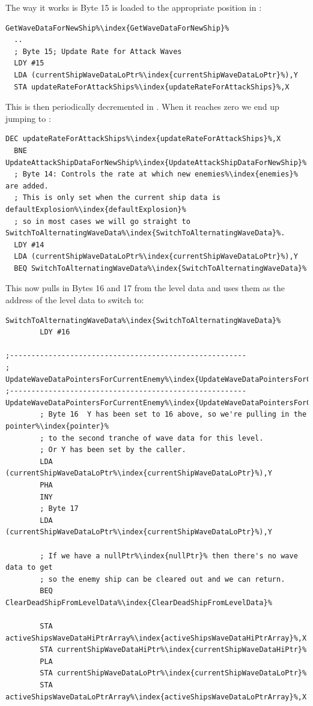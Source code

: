 The way it works is Byte 15 is loaded to the appropriate position in :

\begin{lstlisting}[escapechar=\%]
GetWaveDataForNewShip%\index{GetWaveDataForNewShip}%
  ..
  ; Byte 15; Update Rate for Attack Waves
  LDY #15
  LDA (currentShipWaveDataLoPtr%\index{currentShipWaveDataLoPtr}%),Y
  STA updateRateForAttackShips%\index{updateRateForAttackShips}%,X
\end{lstlisting}

This is then periodically decremented in . When it reaches zero we 
end up jumping to :
\begin{lstlisting}[escapechar=\%]
  DEC updateRateForAttackShips%\index{updateRateForAttackShips}%,X
  BNE UpdateAttackShipDataForNewShip%\index{UpdateAttackShipDataForNewShip}%
  ; Byte 14: Controls the rate at which new enemies%\index{enemies}% are added.
  ; This is only set when the current ship data is defaultExplosion%\index{defaultExplosion}%
  ; so in most cases we will go straight to SwitchToAlternatingWaveData%\index{SwitchToAlternatingWaveData}%.
  LDY #14
  LDA (currentShipWaveDataLoPtr%\index{currentShipWaveDataLoPtr}%),Y
  BEQ SwitchToAlternatingWaveData%\index{SwitchToAlternatingWaveData}%
\end{lstlisting}

This now pulls in Bytes 16 and 17 from the level data and uses them as the address of the level data to 
switch to:
\begin{lstlisting}[escapechar=\%]
SwitchToAlternatingWaveData%\index{SwitchToAlternatingWaveData}%   
        LDY #16

;-------------------------------------------------------
; UpdateWaveDataPointersForCurrentEnemy%\index{UpdateWaveDataPointersForCurrentEnemy}%
;-------------------------------------------------------
UpdateWaveDataPointersForCurrentEnemy%\index{UpdateWaveDataPointersForCurrentEnemy}%
        ; Byte 16  Y has been set to 16 above, so we're pulling in the pointer%\index{pointer}%
        ; to the second tranche of wave data for this level. 
        ; Or Y has been set by the caller.
        LDA (currentShipWaveDataLoPtr%\index{currentShipWaveDataLoPtr}%),Y
        PHA
        INY
        ; Byte 17
        LDA (currentShipWaveDataLoPtr%\index{currentShipWaveDataLoPtr}%),Y

        ; If we have a nullPtr%\index{nullPtr}% then there's no wave data to get
        ; so the enemy ship can be cleared out and we can return.
        BEQ ClearDeadShipFromLevelData%\index{ClearDeadShipFromLevelData}%

        STA activeShipsWaveDataHiPtrArray%\index{activeShipsWaveDataHiPtrArray}%,X
        STA currentShipWaveDataHiPtr%\index{currentShipWaveDataHiPtr}%
        PLA
        STA currentShipWaveDataLoPtr%\index{currentShipWaveDataLoPtr}%
        STA activeShipsWaveDataLoPtrArray%\index{activeShipsWaveDataLoPtrArray}%,X
\end{lstlisting}

